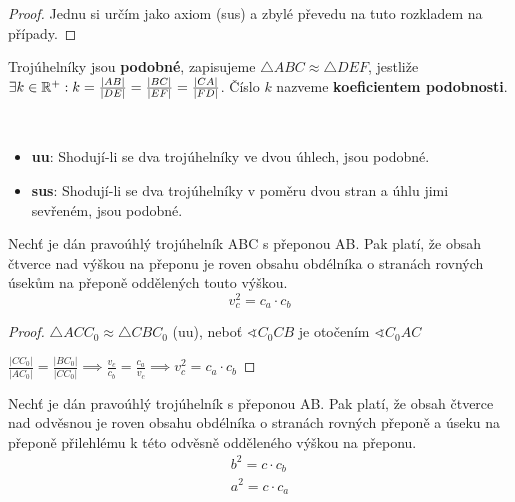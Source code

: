 \begin{proof}
  Jednu si určím jako axiom (sus) a zbylé převedu na tuto rozkladem na případy.
\end{proof}

\begin{definition}
  Trojúhelníky jsou \textbf{podobné}, zapisujeme $\triangle ABC \approx \triangle DEF$, jestliže $\exists k \in \mathbb{R}^+:k = \frac{|AB|}{|DE|}=\frac{|BC|}{|EF|}=\frac{|CA|}{|FD|}$. Číslo $k$ nazveme \textbf{koeficientem podobnosti}.
\end{definition}

\begin{veta}
  \,

  \begin{itemize}
    \item \textbf{uu}: Shodují-li se dva trojúhelníky ve dvou úhlech, jsou podobné.
    \item \textbf{sus}: Shodují-li se dva trojúhelníky v poměru dvou stran a úhlu jimi sevřeném, jsou podobné.
  \end{itemize}
\end{veta}

\begin{veta}
  Nechť je dán pravoúhlý trojúhelník ABC s přeponou AB. Pak platí, že obsah čtverce nad výškou na přeponu je roven obsahu obdélníka o stranách rovných úsekům na přeponě oddělených touto výškou.
  $$v_c^2 = c_a \cdot c_b$$
\end{veta}

\begin{proof}
  $\triangle ACC_0 \approx \triangle CBC_0$ (uu), neboť $\sphericalangle C_0 CB$ je otočením $\sphericalangle C_0 AC$

  $\frac{|CC_0|}{|AC_0|} = \frac{|BC_0|}{|CC_0|} \implies \frac{v_c}{c_b} = \frac{c_a}{v_c} \implies v_c^2 = c_a \cdot c_b$
\end{proof}

\begin{veta}
  Nechť je dán pravoúhlý trojúhelník s přeponou AB. Pak platí, že obsah čtverce nad odvěsnou je roven obsahu obdélníka o stranách rovných přeponě a úseku na přeponě přilehlému k této odvěsně odděleného výškou na přeponu.
  \begin{align*}
    b^2 = c \cdot c_b\\
    a^2 = c \cdot c_a
  \end{align*}
\end{veta}

